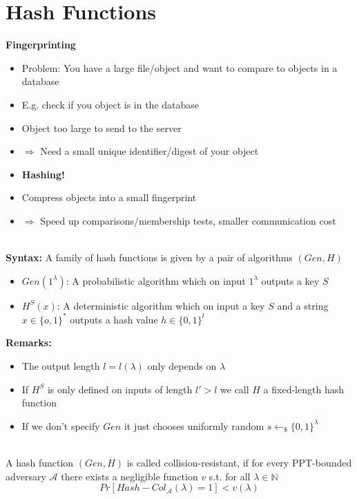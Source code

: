 

\chapter{Hash Functions}

\textbf{Fingerprinting}
\begin{itemize}
    \item Problem: You have a large file/object and want to compare to objects in a database
    \item E.g. check if you object is in the database
    \item Object too large to send to the server
    \item $\Rightarrow$ Need a small unique identifier/digest of your object
    \item \textbf{Hashing!}
    \item Compress objects into a small fingerprint
    \item $\Rightarrow$ Speed up comparisons/membership tests, smaller communication cost\newline
\end{itemize}


\begin{definition}\ \\
    \textbf{Syntax:}
    A family of hash functions is given by a pair of algorithms $(Gen,H)$
    \begin{itemize}
        \item $Gen(1^{\lambda})$: A probabilistic algorithm which on input $1^{\lambda}$ outputs a key $S$
        \item $H^S(x)$: A deterministic algorithm which on input a key $S$ and a string $x \in \{o,1\}^*$ outputs a hash value $h \in \{0,1\}^l$
    \end{itemize}
    \textbf{Remarks:}
    \begin{itemize}
        \item The output length $l=l(\lambda)$ only depends on $\lambda$
        \item If $H^S$ is only defined on inputs of length $l' > l$ we call $H$ a fixed-length hash function
        \item If we don't specify $Gen$ it just chooses uniformly random $s \leftarrow_{\$} \{0,1\}^{\lambda}$\newline
    \end{itemize}
\end{definition}


\begin{definition}\ \\
    A hash function $(Gen,H)$ is called collision-resistant, if for every PPT-bounded adversary $\mathcal{A}$ there exists a negligible function $v$ s.t. for all $\lambda \in \mathbb{N}$
    $$Pr[Hash-Col_{\mathcal{A}}(\lambda)=1] < v(\lambda)$$
\end{definition}


